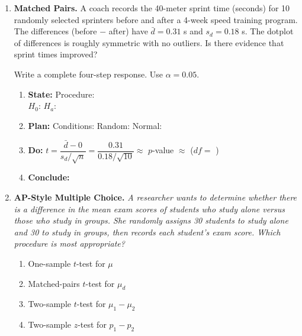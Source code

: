 \documentclass[10pt]{article}
\begin{document}
\begin{enumerate}
\vspace{0.10in}

\item \textbf{Matched Pairs.} \;
      A coach records the 40-meter sprint time (seconds) for 10 randomly selected sprinters
      before and after a 4-week speed training program. The differences (before $-$ after)
      have $\bar d = 0.31$ s and $s_d = 0.18$ s. The dotplot of differences is roughly
      symmetric with no outliers. Is there evidence that sprint times improved?

      Write a complete four-step response. Use $\alpha = 0.05$.

      \begin{enumerate}[label=\alph*.]
        \item \textbf{State:} Procedure: \blank{7cm}\\
              $H_0$: \blank{4.5cm} \quad $H_a$: \blank{4.5cm}
        \item \textbf{Plan:} Conditions: Random: \writeline \quad Normal: \writeline
        \item \textbf{Do:} $t = \dfrac{\bar d - 0}{s_d / \sqrt{n}} = \dfrac{0.31}{0.18/\sqrt{10}} \approx$ \blank{1.8cm} \quad
              $p$-value $\approx$ \blank{2cm} ($df =$ \blank{1.5cm})
        \item \textbf{Conclude:} \writeline \writeline
      \end{enumerate}

\vspace{0.10in}

\item \textbf{AP-Style Multiple Choice.} \;
      \textit{A researcher wants to determine whether there is a difference in the mean exam
      scores of students who study alone versus those who study in groups. She randomly assigns
      30 students to study alone and 30 to study in groups, then records each student's exam
      score. Which procedure is most appropriate?}

      \begin{enumerate}[label=(\Alph*)]
        \item One-sample $t$-test for $\mu$
        \item Matched-pairs $t$-test for $\mu_d$
        \item Two-sample $t$-test for $\mu_1 - \mu_2$
        \item Two-sample $z$-test for $p_1 - p_2$
      \end{enumerate}

\end{enumerate}
\end{document}
